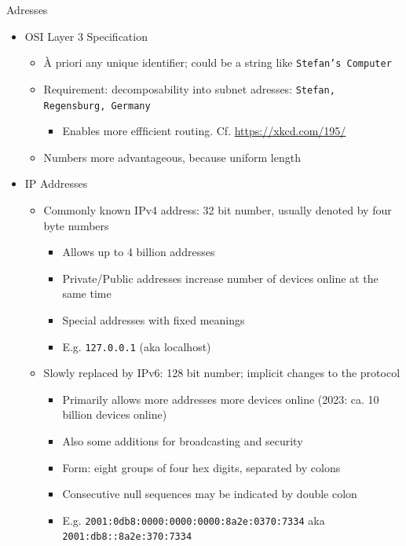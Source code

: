 \begin{frame}{Adresses}
%
\begin{itemize}
\item OSI Layer 3 Specification
	\begin{itemize}
	\item À priori any unique identifier; could be a string like \texttt{Stefan's Computer}
	\item Requirement: decomposability into subnet adresses: \texttt{Stefan, Regensburg, Germany}
		\begin{itemize}
		\item[\Thus] Enables more effficient routing. Cf. \url{https://xkcd.com/195/}
		\end{itemize}
	\item Numbers more advantageous, because uniform length
	\pause
	\end{itemize}
\item IP Addresses
	\begin{itemize}
	\item Commonly known IPv4 address: 32 bit number, usually denoted by four byte numbers
		\begin{itemize}
		\item Allows up to 4 billion addresses
		\item Private/Public addresses increase number of devices online at the same time
		\item Special addresses with fixed meanings
		\item E.\;g. \texttt{127.0.0.1} (aka localhost)
		\end{itemize}
	\pause
	\item Slowly replaced by IPv6: 128 bit number; implicit changes to the protocol
		\begin{itemize}
		\item Primarily allows more addresses \Thus more devices online (2023: ca. 10 billion devices online)
		\item Also some additions for broadcasting and security
		\item Form: eight groups of four hex digits, separated by colons
		\item Consecutive null sequences may be indicated by double colon
		\item E.\;g. \texttt{2001:0db8:{\color{blue}0000:0000:0000}:8a2e:0370:7334} aka \texttt{2001:db8{\color{blue}::}8a2e:370:7334}
		\end{itemize}
	\end{itemize}
\end{itemize}
%
\end{frame}

